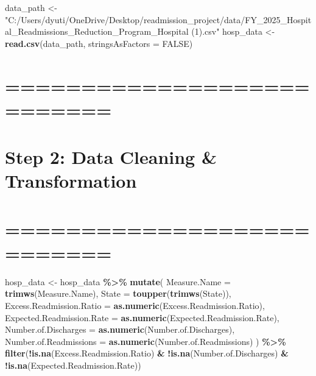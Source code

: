 \documentclass[
]{article}
\newenvironment{Shaded}{\begin{snugshade}}{\end{snugshade}}
\newcommand{\AttributeTok}[1]{\textcolor[rgb]{0.13,0.29,0.53}{#1}}
\newcommand{\ConstantTok}[1]{\textcolor[rgb]{0.56,0.35,0.01}{#1}}
\newcommand{\FunctionTok}[1]{\textcolor[rgb]{0.13,0.29,0.53}{\textbf{#1}}}
\newcommand{\NormalTok}[1]{#1}
\newcommand{\OtherTok}[1]{\textcolor[rgb]{0.56,0.35,0.01}{#1}}
\newcommand{\SpecialCharTok}[1]{\textcolor[rgb]{0.81,0.36,0.00}{\textbf{#1}}}
\newcommand{\StringTok}[1]{\textcolor[rgb]{0.31,0.60,0.02}{#1}}
\begin{document}
\begin{Shaded}
\begin{Highlighting}[]
\NormalTok{data\_path }\OtherTok{\textless{}{-}} \StringTok{"C:/Users/dyuti/OneDrive/Desktop/readmission\_project/data/FY\_2025\_Hospital\_Readmissions\_Reduction\_Program\_Hospital (1).csv"}
\NormalTok{hosp\_data }\OtherTok{\textless{}{-}} \FunctionTok{read.csv}\NormalTok{(data\_path, }\AttributeTok{stringsAsFactors =} \ConstantTok{FALSE}\NormalTok{)}
\end{Highlighting}
\end{Shaded}

\section{===========================}\label{section-2}

\section{Step 2: Data Cleaning \&
Transformation}\label{step-2-data-cleaning-transformation}

\section{===========================}\label{section-3}

\begin{Shaded}
\begin{Highlighting}[]
\NormalTok{hosp\_data }\OtherTok{\textless{}{-}}\NormalTok{ hosp\_data }\SpecialCharTok{\%\textgreater{}\%}
\FunctionTok{mutate}\NormalTok{(}
\AttributeTok{Measure.Name =} \FunctionTok{trimws}\NormalTok{(Measure.Name),}
\AttributeTok{State =} \FunctionTok{toupper}\NormalTok{(}\FunctionTok{trimws}\NormalTok{(State)),}
\AttributeTok{Excess.Readmission.Ratio =} \FunctionTok{as.numeric}\NormalTok{(Excess.Readmission.Ratio),}
\AttributeTok{Expected.Readmission.Rate =} \FunctionTok{as.numeric}\NormalTok{(Expected.Readmission.Rate),}
\AttributeTok{Number.of.Discharges =} \FunctionTok{as.numeric}\NormalTok{(Number.of.Discharges),}
\AttributeTok{Number.of.Readmissions =} \FunctionTok{as.numeric}\NormalTok{(Number.of.Readmissions)}
\NormalTok{) }\SpecialCharTok{\%\textgreater{}\%}
\FunctionTok{filter}\NormalTok{(}\SpecialCharTok{!}\FunctionTok{is.na}\NormalTok{(Excess.Readmission.Ratio) }\SpecialCharTok{\&} \SpecialCharTok{!}\FunctionTok{is.na}\NormalTok{(Number.of.Discharges) }\SpecialCharTok{\&} \SpecialCharTok{!}\FunctionTok{is.na}\NormalTok{(Expected.Readmission.Rate))}
\end{Highlighting}
\end{Shaded}
\end{document}

